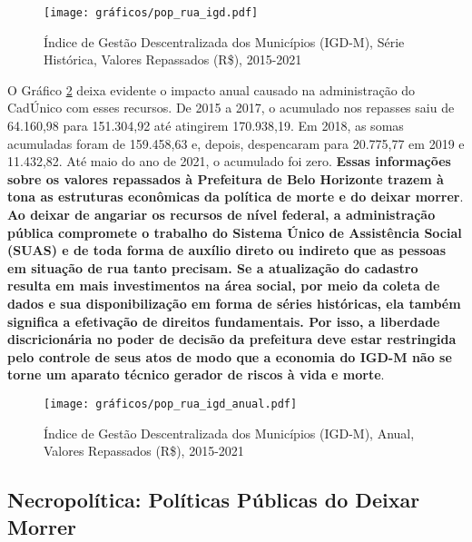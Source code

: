 \documentclass[12pt]{article}
\begin{document}
\begin{figure}[H]
\centering
	\caption{Índice de Gestão Descentralizada dos Municípios (IGD-M), Série Histórica, Valores Repassados (R\$), 2015-2021}
	\texttt{[image: gráficos/pop\_rua\_igd.pdf]}
	\label{fig:pop_rua_igd_serie}
\end{figure}

O Gráfico \ref{fig:pop_rua_igd_anual} deixa evidente o impacto anual causado na administração do CadÚnico com esses recursos. De 2015 a 2017, o acumulado nos repasses saiu de 64.160,98 para 151.304,92 até atingirem 170.938,19. Em 2018, as somas acumuladas foram de 159.458,63 e, depois, despencaram para 20.775,77 em 2019 e 11.432,82. Até maio do ano de 2021, o acumulado foi zero. \textbf{Essas informações sobre os valores repassados à Prefeitura de Belo Horizonte trazem à tona as estruturas econômicas da política de morte e do deixar morrer}.\\

\textbf{Ao deixar de angariar os recursos de nível federal, a administração pública compromete o trabalho do Sistema Único de Assistência Social (SUAS) e de toda forma de auxílio direto ou indireto que as pessoas em situação de rua tanto precisam. Se a atualização do cadastro resulta em mais investimentos na área social, por meio da coleta de dados e sua disponibilização em forma de séries históricas, ela também significa a efetivação de direitos fundamentais. Por isso, a liberdade discricionária no poder de decisão da prefeitura deve estar restringida pelo controle de seus atos de modo que a economia do IGD-M não se torne um aparato técnico gerador de riscos à vida e morte}.\\

\begin{figure}[H]
\centering
	\caption{Índice de Gestão Descentralizada dos Municípios (IGD-M), Anual, Valores Repassados (R\$), 2015-2021}
	\texttt{[image: gráficos/pop\_rua\_igd\_anual.pdf]}
	\label{fig:pop_rua_igd_anual}
\end{figure}

\subsection{Necropolítica: Políticas Públicas do Deixar Morrer}
\label{necropolitica}
\end{document}
